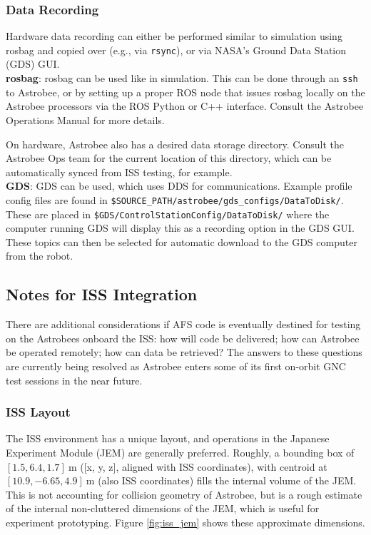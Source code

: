 \documentclass{article}
\begin{document}
\subsubsection{Data Recording}

Hardware data recording can either be performed similar to simulation using rosbag and copied over (e.g., via \texttt{rsync}), or via NASA's Ground Data Station (GDS) GUI.
\\

\textbf{rosbag}: rosbag can be used like in simulation. This can be done through an \texttt{ssh} to Astrobee, or by setting up a proper ROS node that issues rosbag locally on the Astrobee processors via the ROS Python or C++ interface. Consult the Astrobee Operations Manual for more details.

On hardware, Astrobee also has a desired data storage directory. Consult the Astrobee Ops team for the current location of this directory, which can be automatically synced from ISS testing, for example.
\\

\textbf{GDS}: GDS can be used, which uses DDS for communications. Example profile config files are found in \texttt{\$SOURCE\_PATH/astrobee/gds\_configs/DataToDisk/}. These are placed in \texttt{\$GDS/ControlStationConfig/DataToDisk/} where the computer running GDS will display this as a recording option in the GDS GUI. These topics can then be selected for automatic download to the GDS computer from the robot.

\subsection{Notes for ISS Integration}

There are additional considerations if AFS code is eventually destined for testing on the Astrobees onboard the ISS: how will code be delivered; how can Astrobee be operated remotely; how can data be retrieved? The answers to these questions are currently being resolved as Astrobee enters some of its first on-orbit GNC test sessions in the near future.

\subsubsection{ISS Layout}

The ISS environment has a unique layout, and operations in the Japanese Experiment Module (JEM) are generally preferred. Roughly, a bounding box of $[1.5, 6.4, 1.7]\ \text{m}$ ([x, y, z], aligned with ISS coordinates), with centroid at $[10.9, -6.65, 4.9]\ \text{m}$ (also ISS coordinates) fills the internal volume of the JEM. This is not accounting for collision geometry of Astrobee, but is a rough estimate of the internal non-cluttered dimensions of the JEM, which is useful for experiment prototyping. Figure \ref{fig:iss_jem} shows these approximate dimensions.
\end{document}
